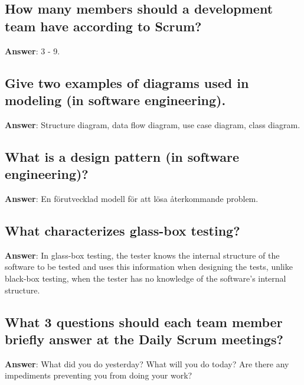 \documentclass[a4paper,11pt,oneside]{article}
\begin{document}
\begin{sloppypar}
\subsection{How many members should a development team have according to Scrum?}

\label{q:244:sa:en:True}

\textbf{Answer}: 3 - 9.



\subsection{Give two examples of diagrams used in modeling (in software engineering).}

\label{q:245:sa:en:True}

\textbf{Answer}: Structure diagram, data flow diagram, use case diagram, class diagram.



\subsection{What is a design pattern (in software engineering)?}

\label{q:246:sa:en:True}

\textbf{Answer}: En f\"orutvecklad modell f\"or att l\"osa \r{a}terkommande problem.



\subsection{What characterizes glass-box testing?}

\label{q:247:sa:en:True}

\textbf{Answer}: In glass-box testing, the tester knows the internal structure of the software to be tested and uses this information when designing the tests, unlike black-box testing, when the tester has no knowledge of the software's internal structure.



\subsection{What 3 questions should each team member briefly answer at the Daily Scrum meetings?}

\label{q:248:sa:en:True}

\textbf{Answer}: What did you do yesterday? What will you do today? Are there any impediments preventing you from doing your work?




\end{sloppypar}
\end{document}
